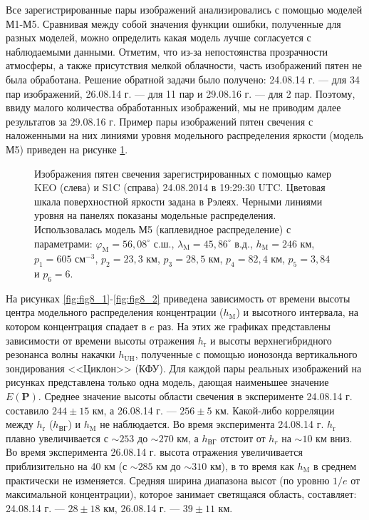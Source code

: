 \documentclass[12pt,a4paper]{article}
\renewcommand{\vec}{\mathbf}
\begin{document}
Все зарегистрированные пары изображений анализировались с помощью моделей М1-М5. Сравнивая между собой значения функции ошибки, полученные для разных моделей, можно определить какая модель лучше согласуется с наблюдаемыми данными. Отметим, что из-за непостоянства прозрачности атмосферы, а также присутствия мелкой облачности, часть изображений пятен не была обработана. Решение обратной задачи было получено: 24.08.14 г. --- для 34 пар изображений, 26.08.14 г. --- для 11 пар и 29.08.16 г. --- для 2 пар. Поэтому, ввиду малого количества обработанных изображений, мы не приводим далее результатов за 29.08.16 г. Пример пары изображений пятен свечения с наложенными на них линиями уровня модельного распределения яркости (модель М5) приведен на рисунке \ref{fig:fig7}.
\begin{figure}[h]
	\caption{Изображения пятен свечения зарегистрированных с помощью камер KEO (слева) и S1C (справа) 24.08.2014 в 19:29:30 UTC. Цветовая шкала поверхностной яркости задана в Рэлеях. Черными линиями уровня на панелях показаны модельные распределения. Использовалась модель М5 (каплевидное распределение) с параметрами: $\varphi_\text{M}=56,08^\circ$ с.ш., $\lambda_\text{M}=45,86^\circ$ в.д., $h_\text{M}=246$ км, $p_1=605$ см$^{-3}$, $p_2=23,3$ км, $p_3=28,5$ км, $p_4=82,4$ км, $p_5=3,84$ и $p_6=6$.}
	\label{fig:fig7}
\end{figure}
На рисунках \ref{fig:fig8_1}-\ref{fig:fig8_2} приведена зависимость от времени высоты центра модельного распределения концентрации ($h_\text{M}$) и высотного интервала, на котором концентрация спадает в $e$ раз. На этих же графиках представлены зависимости от времени высоты отражения $h_\text{r}$ и высоты верхнегибридного резонанса волны накачки $h_\text{UH}$, полученные с помощью ионозонда вертикального зондирования <<Циклон>> (КФУ). Для каждой пары реальных изображений на рисунках представлена только одна модель, дающая наименьшее значение $E(\vec{P})$. Среднее значение высоты области свечения в эксперименте 24.08.14 г. составило $244\pm15$ км, а 26.08.14 г. --- $256\pm5$ км. Какой-либо корреляции между $h_\text{r}$ ($h_\text{ВГ}$) и $h_\text{M}$ не наблюдается. Во время эксперимента 24.08.14 г. $h_\text{r}$ плавно увеличивается с $\sim253$ до $\sim270$ км, а $h_\text{ВГ}$ отстоит от $h_r$ на $\sim10$ км вниз.
Во время эксперимента 26.08.14 г. высота отражения увеличивается приблизительно на 40 км (с $\sim285$ км до $\sim310$ км), в то время как $h_\text{M}$ в среднем практически не изменяется. Средняя ширина диапазона высот (по уровню $1/e$ от максимальной концентрации), которое занимает светящаяся область, составляет: 24.08.14 г. --- $28\pm18$ км, 26.08.14 г. --- $39\pm 11$ км. 
\end{document}
